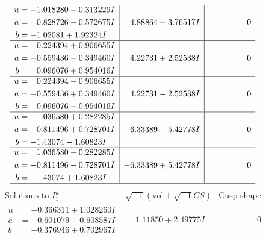 \documentclass[1p]{elsarticle_modified}
\theoremstyle{definition}
\newcommand{\I}{\sqrt{-1}}
\begin{document}
$$\begin{array}{c|c|c}
\begin{aligned}
u &= -1.018280 - 0.313229 I \\
a &= \phantom{-}0.828726 - 0.572675 I \\
b &= -1.02081 + 1.92324 I\end{aligned}
 & \phantom{-}4.88864 - 3.76517 I & \phantom{-0.000000 } 0 \\ \hline\begin{aligned}
u &= \phantom{-}0.224394 + 0.906655 I \\
a &= -0.559436 - 0.349460 I \\
b &= \phantom{-}0.096076 + 0.954016 I\end{aligned}
 & \phantom{-}4.22731 + 2.52538 I & \phantom{-0.000000 } 0 \\ \hline\begin{aligned}
u &= \phantom{-}0.224394 - 0.906655 I \\
a &= -0.559436 + 0.349460 I \\
b &= \phantom{-}0.096076 - 0.954016 I\end{aligned}
 & \phantom{-}4.22731 - 2.52538 I & \phantom{-0.000000 } 0 \\ \hline\begin{aligned}
u &= \phantom{-}1.036580 + 0.282285 I \\
a &= -0.811496 + 0.728701 I \\
b &= -1.43074 - 1.60823 I\end{aligned}
 & -6.33389 - 5.42778 I & \phantom{-0.000000 } 0 \\ \hline\begin{aligned}
u &= \phantom{-}1.036580 - 0.282285 I \\
a &= -0.811496 - 0.728701 I \\
b &= -1.43074 + 1.60823 I\end{aligned}
 & -6.33389 + 5.42778 I & \phantom{-0.000000 } 0\\
 \hline 
 \end{array}$$\newpage$$\begin{array}{c|c|c}  
\text{Solutions to }I^u_{1}& \I (\text{vol} + \sqrt{-1}CS) & \text{Cusp shape}\\
 \hline 
\begin{aligned}
u &= -0.366311 + 1.028260 I \\
a &= -0.601079 - 0.608587 I \\
b &= -0.376946 + 0.702967 I\end{aligned}
 & \phantom{-}1.11850 + 2.49775 I & \phantom{-0.000000 } 0 \\ \hline\begin{aligned}

\end{aligned}
\end{array}$$
\end{document}
